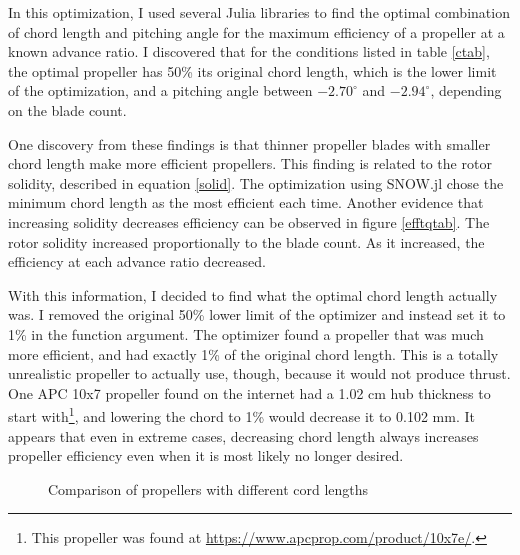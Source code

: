 \documentclass[journal ]{new-aiaa}
\newcounter{ctab}
\begin{document}
In this optimization, I used several Julia libraries to find the optimal combination of chord length and pitching angle for the maximum efficiency of a propeller at a known advance ratio. I discovered that for the conditions listed in table \eqref{ctab}, the optimal propeller has 50\% its original chord length, which is the lower limit of the optimization, and a pitching angle between $-2.70^{\circ}$ and $-2.94^{\circ}$, depending on the blade count.

One discovery from these findings is that thinner propeller blades with smaller chord length make more efficient propellers. This finding is related to the rotor solidity, described in equation \eqref{solid}. The optimization using SNOW.jl chose the minimum chord length as the most efficient each time. Another evidence that increasing solidity decreases efficiency can be observed in figure \eqref{efftqtab}. The rotor solidity increased proportionally to the blade count. As it increased, the efficiency at each advance ratio decreased.

With this information, I decided to find what the optimal chord length actually was. I removed the original  50\% lower limit of the optimizer and instead set it to 1\% in the function argument. The optimizer found a propeller that was much more efficient, and had exactly 1\% of the original chord length. This is a totally unrealistic propeller to actually use, though, because it would not produce thrust. One APC 10x7 propeller found on the internet had a 1.02 cm hub thickness to start with\footnote{This propeller was found at \url{https://www.apcprop.com/product/10x7e/}.}, and lowering the chord to 1\% would decrease it to 0.102 mm. It appears that even in extreme cases, decreasing chord length always increases propeller efficiency even when it is most likely no longer desired.

\begin{figure}[H]
\centering
	
	\caption{Comparison of propellers with different cord lengths}
	\captionsetup{aboveskip=0pt,font=it}
	\label{mag}
\end{figure}
\end{document}

